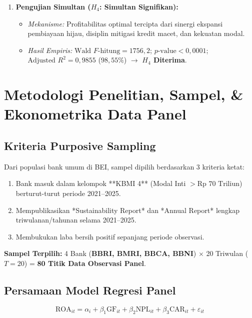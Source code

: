 \documentclass[11pt,a4paper]{article}
\begin{document}
\begin{enumerate}
    \item \textbf{Pengujian Simultan ($H_4$: Simultan Signifikan):}
    \begin{itemize}
        \item \textit{Mekanisme:} Profitabilitas optimal tercipta dari sinergi ekspansi pembiayaan hijau, disiplin mitigasi kredit macet, dan kekuatan modal.
        \item \textit{Hasil Empiris:} $\text{Wald } F\text{-hitung} = 1756{,}2$; $p\text{-value} < 0{,}0001$; $\text{Adjusted } R^2 = 0{,}9855$ ($98{,}55\%$) $\rightarrow$ \textbf{$H_4$ Diterima}.
    \end{itemize}
\end{enumerate}

\section{Metodologi Penelitian, Sampel, \& Ekonometrika Data Panel}

\subsection{Kriteria Purposive Sampling}
Dari populasi bank umum di BEI, sampel dipilih berdasarkan 3 kriteria ketat:
\begin{enumerate}
    \item Bank masuk dalam kelompok **KBMI 4** (Modal Inti $> \text{Rp } 70\text{ Triliun}$) berturut-turut periode 2021--2025.
    \item Mempublikasikan *Sustainability Report* dan *Annual Report* lengkap triwulanan/tahunan selama 2021--2025.
    \item Membukukan laba bersih positif sepanjang periode observasi.
\end{enumerate}
\textbf{Sampel Terpilih:} 4 Bank (\textbf{BBRI, BMRI, BBCA, BBNI}) $\times$ 20 Triwulan ($T=20$) = \textbf{80 Titik Data Observasi Panel}.

\subsection{Persamaan Model Regresi Panel}
\begin{equation}
    \text{ROA}_{it} = \alpha_i + \beta_1 \text{GF}_{it} + \beta_2 \text{NPL}_{it} + \beta_3 \text{CAR}_{it} + \varepsilon_{it}
\end{equation}
\end{document}
